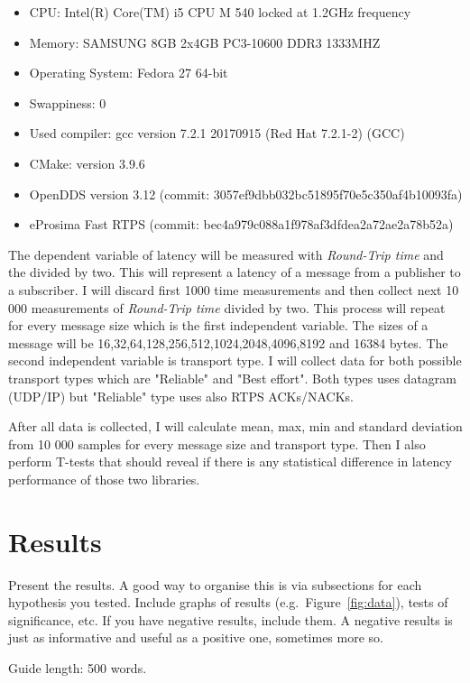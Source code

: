 \documentclass{csfourzero}
\begin{document}
\begin{itemize}
	\item CPU: Intel(R) Core(TM) i5 CPU M 540 locked at 1.2GHz frequency
	\item Memory: SAMSUNG 8GB 2x4GB PC3-10600 DDR3 1333MHZ
	\item Operating System: Fedora 27 64-bit
	\item Swappiness: 0
	\item Used compiler: gcc version 7.2.1 20170915 (Red Hat 7.2.1-2) (GCC)
	\item CMake: version 3.9.6
	\item OpenDDS version 3.12 (commit: 3057ef9dbb032bc51895f70e5c350af4b10093fa) 
	\item eProsima Fast RTPS (commit: bec4a979c088a1f978af3dfdea2a72ae2a78b52a)
\end{itemize}

The dependent variable of latency will be measured with \textit{Round-Trip time} and the divided by two. This will represent a latency of a message from a publisher to a subscriber. I will discard first 1000 time measurements and then collect next 10 000 measurements of \textit{Round-Trip time} divided by two. This process will repeat for every message size which is the first independent variable. The sizes of a message will be 16,32,64,128,256,512,1024,2048,4096,8192 and 16384 bytes. The second independent variable is transport type. I will collect data for both possible transport types which are "Reliable" and "Best effort". Both types uses datagram (UDP/IP) but "Reliable" type uses also RTPS ACKs/NACKs.

After all data is collected, I will calculate mean, max, min and standard deviation from 10 000 samples for every message size and transport type. Then I also perform T-tests that should reveal if there is any statistical difference in latency performance of those two libraries.

\section{Results}
\label{sec:results}

Present the results. A good way to organise this is via subsections
for each hypothesis you tested. Include graphs of results
(e.g.\ Figure~\ref{fig:data}), tests of significance, etc. If you have
negative results, include them. A negative results is just as
informative and useful as a positive one, sometimes more so.

Guide length: 500 words.
\end{document}
